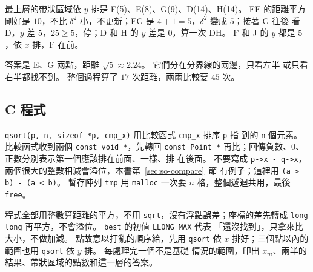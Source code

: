 最上層的帶狀區域依 $y$ 排是 F(5)、E(8)、G(9)、D(14)、H(14)。 FE 的距離平方剛好是
$10$，不比 $\delta^2$ 小，不更新；EG 是 $4 + 1 = 5$，$\delta^2$ 變成 $5$；接著 G 往後
看 D，$y$ 差 $5$，$25 \ge 5$，停；D 和 H 的 $y$ 差是 $0$，算一次 DH。 F 和 J 的 $y$
都是 $5$，依 $x$ 排，F 在前。

答案是 E、G 兩點，距離 $\sqrt{5} \approx 2.24$。 它們分在分界線的兩邊，只看左半
或只看右半都找不到。 整個過程算了 $17$ 次距離，兩兩比較要 $45$ 次。

\subsection{C 程式}

\begin{cbookrecap}[第~18~章 18.6 節、第~19~章 19.3 節]
\texttt{qsort(p, n, sizeof *p, cmp\_x)} 用比較函式 \texttt{cmp\_x} 排序 \texttt{p} 指
到的 \texttt{n} 個元素。 比較函式收到兩個 \texttt{const void *}，先轉回
\texttt{const Point *} 再比；回傳負數、$0$、正數分別表示第一個應該排在前面、一樣、排
在後面。 不要寫成 \texttt{p->x - q->x}，兩個很大的整數相減會溢位，本書第~\ref{sec:so-compare}~節
有例子；這裡用 \texttt{(a > b) - (a < b)}。 暫存陣列 \texttt{tmp} 用
\texttt{malloc} 一次要 $n$ 格，整個遞迴共用，最後 \texttt{free}。
\end{cbookrecap}

程式全部用整數算距離的平方，不用 \texttt{sqrt}，沒有浮點誤差；座標的差先轉成
\texttt{long long} 再平方，不會溢位。 \texttt{best} 的初值 \texttt{LLONG\_MAX} 代表
「還沒找到」，只拿來比大小，不做加減。 點故意以打亂的順序給，先用 \texttt{qsort}
依 $x$ 排好；三個點以內的範圍也用 \texttt{qsort} 依 $y$ 排。 每處理完一個不是基礎
情況的範圍，印出 $x_m$、兩半的結果、帶狀區域的點數和這一層的答案。

